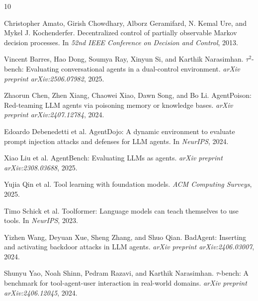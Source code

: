 \documentclass[11pt]{article}
\begin{document}
    
    \begin{thebibliography}{10}

        Christopher Amato, Girish Chowdhary, Alborz Geramifard, N. Kemal Ure, and Mykel J. Kochenderfer.
        \newblock Decentralized control of partially observable Markov decision processes.
        \newblock In \emph{52nd IEEE Conference on Decision and Control}, 2013.

        Vincent Barres, Hao Dong, Soumya Ray, Xinyun Si, and Karthik Narasimhan.
        \newblock $\tau^2$-bench: Evaluating conversational agents in a dual-control environment.
        \newblock \emph{arXiv preprint arXiv:2506.07982}, 2025.

        Zhaorun Chen, Zhen Xiang, Chaowei Xiao, Dawn Song, and Bo Li.
        \newblock AgentPoison: Red-teaming LLM agents via poisoning memory or knowledge bases.
        \newblock \emph{arXiv preprint arXiv:2407.12784}, 2024.

        Edoardo Debenedetti et al.
        \newblock AgentDojo: A dynamic environment to evaluate prompt injection attacks and defenses for LLM agents.
        \newblock In \emph{NeurIPS}, 2024.

        Xiao Liu et al.
        \newblock AgentBench: Evaluating LLMs as agents.
        \newblock \emph{arXiv preprint arXiv:2308.03688}, 2025.

        Yujia Qin et al.
        \newblock Tool learning with foundation models.
        \newblock \emph{ACM Computing Surveys}, 2025.

        Timo Schick et al.
        \newblock Toolformer: Language models can teach themselves to use tools.
        \newblock In \emph{NeurIPS}, 2023.

        Yizhen Wang, Deyuan Xue, Sheng Zhang, and Shuo Qian.
        \newblock BadAgent: Inserting and activating backdoor attacks in LLM agents.
        \newblock \emph{arXiv preprint arXiv:2406.03007}, 2024.

        Shunyu Yao, Noah Shinn, Pedram Razavi, and Karthik Narasimhan.
        \newblock $\tau$-bench: A benchmark for tool-agent-user interaction in real-world domains.
        \newblock \emph{arXiv preprint arXiv:2406.12045}, 2024.


\end{thebibliography}
\end{document}
